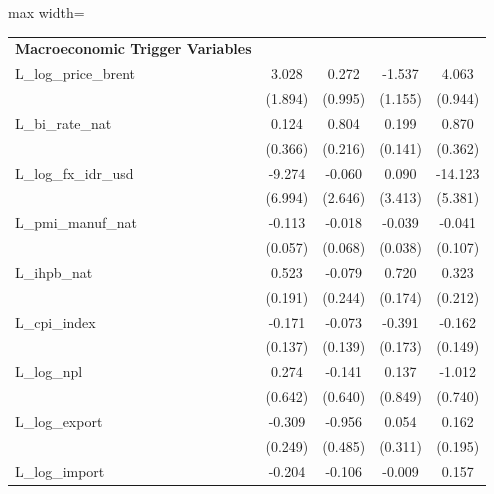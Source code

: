 \begin{table}[H]
\begin{adjustbox}{max width=\textwidth}
\begin{tabular}{l*{4}{c}}
\addlinespace\textbf{Macroeconomic Trigger Variables}&                     &                     &                     &                     \\
L\_log\_price\_brent&       3.028         &       0.272         &      -1.537         &       4.063\sym{***}\\
            &     (1.894)         &     (0.995)         &     (1.155)         &     (0.944)         \\
L\_bi\_rate\_nat&       0.124         &       0.804\sym{***}&       0.199         &       0.870\sym{*}  \\
            &     (0.366)         &     (0.216)         &     (0.141)         &     (0.362)         \\
L\_log\_fx\_idr\_usd&      -9.274         &      -0.060         &       0.090         &     -14.123\sym{**} \\
            &     (6.994)         &     (2.646)         &     (3.413)         &     (5.381)         \\
L\_pmi\_manuf\_nat&      -0.113\sym{*}  &      -0.018         &      -0.039         &      -0.041         \\
            &     (0.057)         &     (0.068)         &     (0.038)         &     (0.107)         \\
L\_ihpb\_nat  &       0.523\sym{**} &      -0.079         &       0.720\sym{***}&       0.323         \\
            &     (0.191)         &     (0.244)         &     (0.174)         &     (0.212)         \\
L\_cpi\_index &      -0.171         &      -0.073         &      -0.391\sym{*}  &      -0.162         \\
            &     (0.137)         &     (0.139)         &     (0.173)         &     (0.149)         \\
L\_log\_npl   &       0.274         &      -0.141         &       0.137         &      -1.012         \\
            &     (0.642)         &     (0.640)         &     (0.849)         &     (0.740)         \\
L\_log\_export&      -0.309         &      -0.956\sym{*}  &       0.054         &       0.162         \\
            &     (0.249)         &     (0.485)         &     (0.311)         &     (0.195)         \\
L\_log\_import&      -0.204\sym{*}  &      -0.106         &      -0.009         &       0.157\sym{*}  \\

\end{tabular}
\end{adjustbox}
\end{table}
